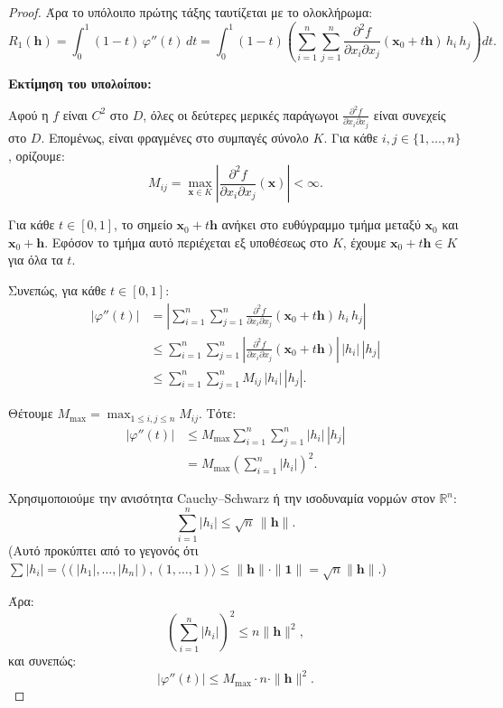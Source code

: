 \documentclass[10pt,a4paper,twoside,openany]{book}
\theoremstyle{plain}
\theoremstyle{definition}
\theoremstyle{remark}
\numberwithin{equation}{section}
\begin{document}
\begin{proof}
Άρα το υπόλοιπο πρώτης τάξης ταυτίζεται με το ολοκλήρωμα:
\[
R_1(\mathbf{h}) = \int_0^1 (1-t) \, \varphi''(t) \, dt = \int_0^1 (1-t) \left( \sum_{i=1}^n \sum_{j=1}^n \frac{\partial^2 f}{\partial x_i \partial x_j}(\mathbf{x}_0 + t\mathbf{h}) \, h_i \, h_j \right) dt.
\]

\textbf{Εκτίμηση του υπολοίπου:}

Αφού η \(f\) είναι \(C^2\) στο \(D\), όλες οι δεύτερες μερικές παράγωγοι \(\frac{\partial^2 f}{\partial x_i \partial x_j}\) είναι συνεχείς στο \(D\). Επομένως, είναι φραγμένες στο συμπαγές σύνολο \(K\). Για κάθε \(i, j \in \{1, \dots, n\}\), ορίζουμε:
\[
M_{ij} = \max_{\mathbf{x} \in K} \left| \frac{\partial^2 f}{\partial x_i \partial x_j}(\mathbf{x}) \right| < \infty.
\]

Για κάθε \(t \in [0,1]\), το σημείο \(\mathbf{x}_0 + t\mathbf{h}\) ανήκει στο ευθύγραμμο τμήμα μεταξύ \(\mathbf{x}_0\) και \(\mathbf{x}_0 + \mathbf{h}\). Εφόσον το τμήμα αυτό περιέχεται εξ υποθέσεως στο \(K\), έχουμε \(\mathbf{x}_0 + t\mathbf{h} \in K\) για όλα τα \(t\).

Συνεπώς, για κάθε \(t \in [0,1]\):
\begin{align*}
|\varphi''(t)| &= \left| \sum_{i=1}^n \sum_{j=1}^n \frac{\partial^2 f}{\partial x_i \partial x_j}(\mathbf{x}_0 + t\mathbf{h}) \, h_i \, h_j \right| \\
&\le \sum_{i=1}^n \sum_{j=1}^n \left| \frac{\partial^2 f}{\partial x_i \partial x_j}(\mathbf{x}_0 + t\mathbf{h}) \right| \, |h_i| \, |h_j| \\
&\le \sum_{i=1}^n \sum_{j=1}^n M_{ij} \, |h_i| \, |h_j|.
\end{align*}

Θέτουμε \(M_{\max} = \max_{1 \le i,j \le n} M_{ij}\). Τότε:
\begin{align*}
|\varphi''(t)| &\le M_{\max} \sum_{i=1}^n \sum_{j=1}^n |h_i| \, |h_j| \\
&= M_{\max} \left( \sum_{i=1}^n |h_i| \right)^2.
\end{align*}

Χρησιμοποιούμε την ανισότητα Cauchy–Schwarz ή την ισοδυναμία νορμών στον \(\mathbb{R}^n\):
\[
\sum_{i=1}^n |h_i| \le \sqrt{n} \, \|\mathbf{h}\|.
\]
(Αυτό προκύπτει από το γεγονός ότι \(\sum |h_i| = \langle (|h_1|,\dots,|h_n|), (1,\dots,1) \rangle \le \|\mathbf{h}\| \cdot \|\mathbf{1}\| = \sqrt{n} \|\mathbf{h}\|\).)

Άρα:
\[
\left( \sum_{i=1}^n |h_i| \right)^2 \le n \|\mathbf{h}\|^2,
\]
και συνεπώς:
\[
|\varphi''(t)| \le M_{\max} \cdot n \cdot \|\mathbf{h}\|^2.
\]


\end{proof}
\end{document}
